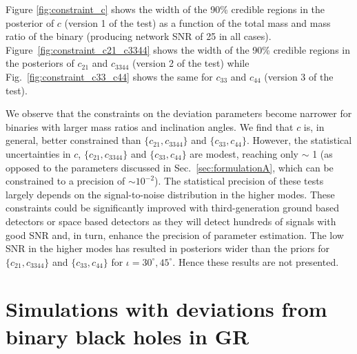 \documentclass[prd,preprintnumbers,twocolumn,eqsecnum,floatfix,a4paper,nofootinbib,superscriptaddress]{revtex4}
\begin{document}
Figure \ref{fig:constraint_c} shows the width of the 90\% credible regions in the posterior of $c$  (version 1 of the test) as a function of the total mass and mass ratio of the binary (producing network SNR of 25 in all cases). Figure~\ref{fig:constraint_c21_c3344} shows the width of the 90\% credible regions in the posteriors of $c_{21}$ and  $c_{3344}$  (version 2 of the test) while Fig.~\ref{fig:constraint_c33_c44} shows the same for $c_{33}$ and  $c_{44}$  (version 3 of the test). 


We observe that the constraints on the deviation parameters become narrower for binaries with larger mass ratios and inclination angles. We find that $c$ is, in general, better constrained than $\{c_{21}, c_{3344}\}$ and $\{c_{33}, c_{44}\}$. However, the statistical uncertainties in $c$, $\{c_{21}, c_{3344}\}$ and $\{c_{33}, c_{44}\}$ are modest, reaching only $\sim$ 1 (as opposed to the parameters discussed in Sec.~\ref{sec:formulationA}, which can be constrained to a precision of $\sim 10^{-2}$). The statistical precision of these tests largely depends on the signal-to-noise distribution in the higher modes. These constraints could be significantly improved with third-generation ground based detectors or space based detectors as they will detect hundreds of signals with good SNR and, in turn, enhance the precision of parameter estimation. The low SNR in the higher modes has resulted in posteriors wider than the priors for $\{c_{21}, c_{3344}\}$ and $\{c_{33}, c_{44}\}$ for $\iota={30^{\circ},45^{\circ}}$. Hence these results are not presented. 


\section{Simulations with deviations from binary black holes in GR}
\label{sec:simulation_nonbbh}
\end{document}
